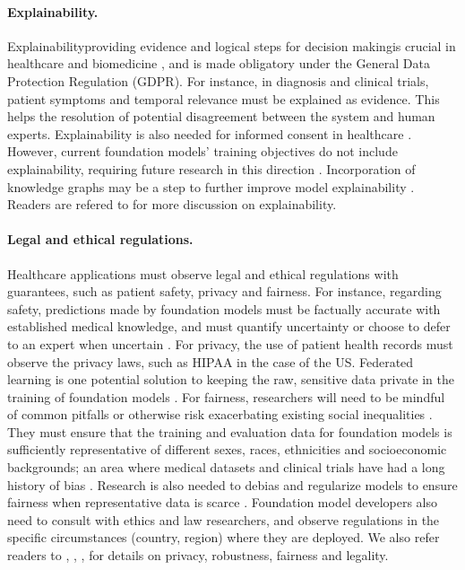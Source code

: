 \paragraph{Explainability.}
Explainability\dash{}providing evidence and logical steps for decision making\dash{}is crucial in healthcare and biomedicine \citep{holzinger2019causability}, and is made obligatory under the General Data Protection Regulation (GDPR). 
For instance, in diagnosis and clinical trials, patient symptoms and temporal relevance must be explained as evidence. This helps the resolution of potential disagreement between the system and human experts. Explainability is also needed for informed consent in healthcare \citep{amann2020explainability}.
However, current foundation models' training objectives do not include explainability, requiring future research in this direction \citep{linardatos2021explainable}. Incorporation of knowledge graphs may be a step to further improve model explainability \citep{roberts2020much, xu2020building, jin2021biomedical}.
Readers are refered to  for more discussion on explainability.

\paragraph{Legal and ethical regulations.}
Healthcare applications must observe legal and ethical regulations with guarantees, such as patient safety, privacy and fairness. 
For instance, regarding safety, predictions made by foundation models must be factually accurate with established medical knowledge, and must quantify uncertainty or choose to defer to an expert when uncertain \citep{challen2019artificial,mozannar2020consistent}. For privacy, the use of patient health records must observe the privacy laws, such as HIPAA \citep{act1996health} in the case of the US. Federated learning is one potential solution to keeping the raw, sensitive data private in the training of foundation models \citep{chamikara2021privacy}.
For fairness, researchers will need to be mindful of common pitfalls or otherwise risk exacerbating existing social inequalities \cite{ chen2019can, wiens2019no, chen2020treating}. They must ensure that the training and evaluation data for foundation models is sufficiently representative of different sexes, races, ethnicities and socioeconomic backgrounds; an area where medical datasets and clinical trials have had a long history of bias \citep{martinez2020ethical,kaushal2020geographic}. Research is also needed to debias and regularize models to ensure fairness when representative data is scarce \cite{zhao2020training}. Foundation model developers also need to consult with ethics and law researchers, and observe regulations in the specific circumstances (\eg country, region) where they are deployed. 
We also refer readers to , , ,  for details on privacy, robustness, fairness and legality. 


